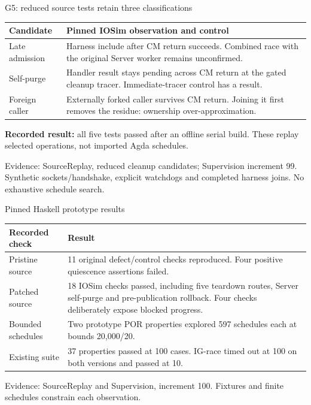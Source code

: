 \documentclass[11pt,aspectratio=169]{beamer}
\newcommand{\evidence}[1]{\vfill{\fontsize{7}{8}\selectfont\color{Muted}Evidence: #1\par}}
\begin{document}
\begin{frame}{G5: reduced source tests retain three classifications}
\small\renewcommand{\arraystretch}{1.2}
\begin{tabularx}{\textwidth}{@{}P{28mm}Y@{}}
\toprule
Candidate & Pinned IOSim observation and control \\ \midrule
Late admission & Harness include after CM return succeeds. Combined race with the original Server worker remains unconfirmed. \\[2mm]
Self-purge & Handler result stays pending across CM return at the gated cleanup tracer. Immediate-tracer control has a result. \\[2mm]
Foreign caller & Externally forked caller survives CM return. Joining it first removes the residue: ownership over-approximation. \\[2mm]
\bottomrule
\end{tabularx}\par\vspace{3mm}\textbf{Recorded result:} all five tests passed after an offline serial build. These replay selected operations, not imported Agda schedules.
\evidence{SourceReplay, reduced cleanup candidates; Supervision increment 99. Synthetic sockets/handshake, explicit watchdogs and completed harness joins. No exhaustive schedule search.}
\end{frame}

\begin{frame}{Pinned Haskell prototype results}
\small\renewcommand{\arraystretch}{1.2}
\begin{tabularx}{\textwidth}{@{}P{31mm}Y@{}}
\toprule
Recorded check & Result \\ \midrule
Pristine source & 11 original defect/control checks reproduced. Four positive quiescence assertions failed. \\[2mm]
Patched source & 18 IOSim checks passed, including five teardown routes, Server self-purge and pre-publication rollback. Four checks deliberately expose blocked progress. \\[2mm]
Bounded schedules & Two prototype POR properties explored 597 schedules each at bounds 20,000/20. \\[2mm]
Existing suite & 37 properties passed at 100 cases. IG-race timed out at 100 on both versions and passed at 10. \\[2mm]
\bottomrule
\end{tabularx}
\evidence{SourceReplay and Supervision, increment 100. Fixtures and finite schedules constrain each observation.}
\end{frame}
\end{document}
